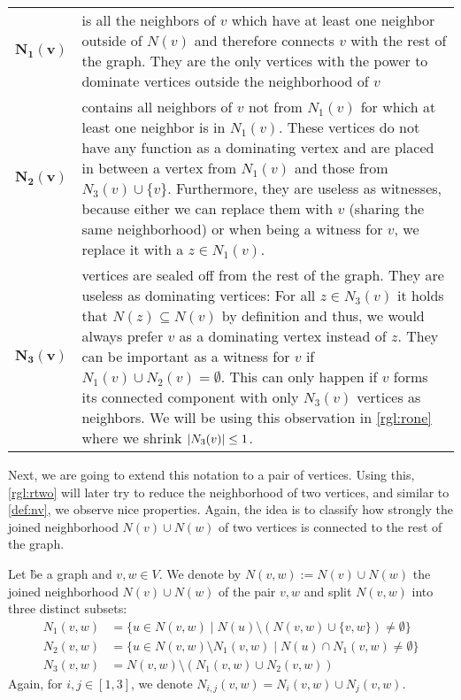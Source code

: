 \begin{xltabular}{\textwidth}{lX}
\textbf{$\mathbf{N_1(v)}$} & is all the neighbors of $v$ which have at least one neighbor outside of $N(v)$ and therefore connects $v$ with the rest of the graph. They are the only vertices with the power to dominate vertices outside the neighborhood of $v$ \\

\textbf{$\mathbf{N_2(v)}$} & contains all neighbors of $v$ not from $N_1(v)$ for which  at least one neighbor is in $N_1(v)$. These vertices do not have any function as a dominating vertex and are placed in between a vertex from $N_1(v)$ and those from  $N_3(v) \cup \{ v \}$. Furthermore, they are useless as witnesses, because either we can replace them with $v$ (sharing the same neighborhood) or when being a witness for $v$, we replace it with a $z \in N_1(v)$. \\

$\mathbf{N_3(v)}$ & vertices are sealed off from the rest of the graph. They are useless as dominating vertices: For all $z \in N_3(v)$ it holds that  $N(z) \subseteq N(v)$ by definition and thus, we would always prefer $v$ as a dominating vertex instead of $z$. They can be important as a witness for $v$ if $N_1(v) \cup N_2(v) =\emptyset$. This can only happen if $v$ forms its connected component with only $N_3(v)$ vertices as neighbors. We will be using this observation in \cref{rgl:rone} where we shrink $\abs{N_3(v)} \leq 1$.
\end{xltabular}

Next, we are going to extend this notation to a pair of vertices. Using this, \cref{rgl:rtwo} will later try to reduce the neighborhood of two vertices, and similar to \cref{def:nv}, we observe nice properties. Again, the idea is to classify how strongly the joined neighborhood $N(v) \cup N(w)$ of two vertices is connected to the rest of the graph.

\begin{definition}
    Let \G be a graph and $v,w \in V$. We denote by $N(v,w) := N(v) \cup N(w)$ the joined neighborhood $N(v) \cup N(w)$ of the pair $v,w$ and split $N(v,w)$ into three distinct subsets:
    \begin{align}
        N_1(v,w) & = \{u \in N(v,w) \mid N(u) \setminus (N(v,w)\cup \{v,w\}) \neq \emptyset \}  \\
        N_2(v,w) & = \{u \in N(v,w)\setminus N_1(v,w) \mid N(u) \cap N_1(v,w) \neq \emptyset \} \\
        N_3(v,w) & =  N(v,w) \setminus (N_1(v,w) \cup N_2(v,w))
    \end{align}
    Again, for $i,j \in [1,3]$, we denote $N_{i,j}(v,w) = N_i(v,w) \cup N_j(v,w)$.
\end{definition}

